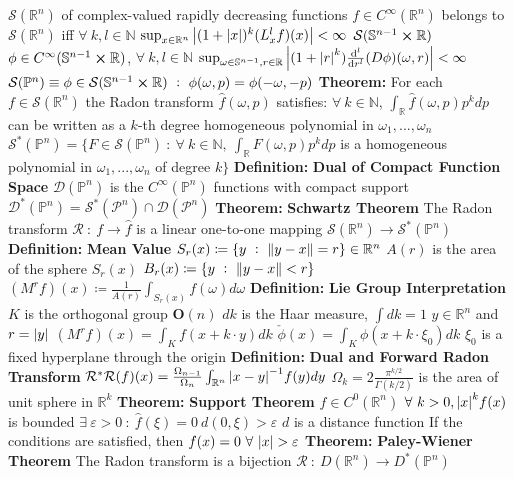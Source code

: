 \documentclass[14pt]{extarticle}
\def\Definition{{\color{blue} \textbf{Definition:} }}
\def\Theorem{{\color{red} \textbf{Theorem:} }}
\begin{document}
\begin{outline}
			\2	$\mathcal{S}(\mathbb{R}^n)$ of complex-valued rapidly decreasing functions
				\3	$f \in C^{\infty}(\mathbb{R}^n)$ belongs to $\mathcal{S}(\mathbb{R}^n)$
						iff $\forall~k,l \in \mathbb{N}$
				\3	$\sup_{x \in \mathbb{R}^n}\abs{(1 + \abs{x})^k(L_x^lf)(x)} < \infty$
			\2	$\mathcal{S}(\mathbb{S}^{n-1} \cross \mathbb{R})$ 
				\3	$\phi \in C^{\infty}(\mathbb{S}^{n-1} \cross \mathbb{R})$, $\forall~k,l \in \mathbb{N}$
				\3	$\sup_{\omega \in \mathbb{S}^{n-1},r \in \mathbb{R}} 
						\abs{(1 + \abs{r}^k) \od[l]{}{r}(D\phi)(\omega,r)} < \infty$
			\2	$\mathcal{S}(\mathbb{P}^n) \equiv \phi \in \mathcal{S}(\mathbb{S}^{n-1} \cross \mathbb{R})
					~:~\phi(\omega,p) = \phi(-\omega,-p)$
		\1	\Theorem For each $f \in \mathcal{S}(\mathbb{R}^n)$ the Radon transform
				$\hat{f}(\omega,p)$ satisfies: $\forall~k \in \mathbb{N}$, 
				$\int_{\mathbb{R}}\hat{f}(\omega,p)p^kdp$ can be written as a $k$-th
				degree homogeneous polynomial in $\omega_1,...,\omega_n$
				\2	$\mathcal{S}^*(\mathbb{P}^n) = \{F \in \mathcal{S}(\mathbb{P}^n)~:~
				\forall~k \in \mathbb{N},~\int_{\mathbb{R}}F(\omega,p)p^k dp$ is a
				homogeneous polynomial in $\omega_1,...,\omega_n$ of degree $k\}$
		\1	\Definition \textbf{Dual of Compact Function Space}
			\2	$\mathcal{D}(\mathbb{P}^n)$ is the $C^{\infty}(\mathbb{P}^n)$ functions with compact support
			\2	$\mathcal{D}^*(\mathbb{P}^n) = \mathcal{S}^*(\mathcal{P}^n) \cap \mathcal{D}(\mathcal{P}^n)$ 
		\1	\Theorem \textbf{Schwartz Theorem}
			\2	The Radon transform $\mathcal{R}~:~f \rightarrow \hat{f}$ is a linear
					one-to-one mapping $\mathcal{S}(\mathbb{R}^n) \rightarrow \mathcal{S}^*(\mathbb{P}^n)$
		\1	\Definition \textbf{Mean Value}
			\2	$S_r(x) \coloneqq \{y~:~\norm{y - x} = r\} \in \mathbb{R}^n$
			\2	$A(r)$ is the area of the sphere $S_r(x)$
			\2	$B_r(x) \coloneqq \{y~:~\norm{y - x} < r\}$
			\2	$(M^rf)(x) \coloneqq \frac{1}{A(r)}\int_{S_r(x)}f(\omega)d\omega$
			\2	\Definition \textbf{Lie Group Interpretation}
				\3	$K$ is the orthogonal group $\bm{O}(n)$
				\3	$dk$ is the Haar measure, $\int dk = 1$
				\3	$y \in \mathbb{R}^n$ and $r = \abs{y}$
				\3	$(M^rf)(x) = \int_K f(x + k \cdot y)dk$
				\3	$\check{\phi}(x) = \int_K \phi(x + k \cdot \xi_0)dk$
					\4	$\xi_0$ is a fixed hyperplane through the origin
		\1	\Definition \textbf{Dual and Forward Radon Transform}
			\2	$\mathcal{R}^*\mathcal{R}(f)(x) = 
				\frac{\Omega_{n-1}}{\Omega_n}\int_{\mathbb{R}^n}\abs{x - y}^{-1}f(y)dy$
				\3	$\Omega_k = 2 \frac{\pi^{k/2}}{\Gamma(k/2)}$ is the area of unit
						sphere in $\mathbb{R}^k$
		\1	\Theorem \textbf{Support Theorem}
			\2	$f \in C^0(\mathbb{R}^n)$
			\2	$\forall~k > 0, \abs{x}^kf(x)$ is bounded
			\2	$\exists~\varepsilon > 0~:~\hat{f}(\xi) = 0~d(0,\xi) > \varepsilon$
				\3	$d$ is a distance function
			\2	If the conditions are satisfied, then $f(x) = 0~\forall~\abs{x} > \varepsilon$
		\1	\Theorem \textbf{Paley-Wiener Theorem}
			\2	The Radon transform is a bijection $\mathcal{R}~:~D(\mathbb{R}^n) \rightarrow D^*(\mathbb{P}^n)$
	

\end{outline}
\end{document}

